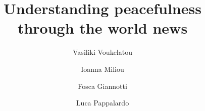 \documentclass{bmcart}
\begin{document}
\begin{frontmatter}

\begin{fmbox}


\title{Understanding peacefulness through the world news}


\author[
   addressref={aff1, aff3},                   %
   corref={aff3},                       %
   email={vasiliki.voukelatou@sns.it}   %
]{Vasiliki Voukelatou}
\author[
   addressref={aff2},
   email={ioanna.miliou@dsv.su.se}
]{Ioanna Miliou}
\author[
   addressref={aff1,aff3},
   email={fosca.giannotti@isti.cnr.it}
]{Fosca Giannotti}
\author[
   addressref={aff3},
   email={luca.pappalardo@isti.cnr.it}
]{Luca Pappalardo}


\address[id=aff1]{%
  , %
  ,                              %
}
\address[id=aff2]{%
  ,
}


\end{fmbox}
\end{frontmatter}
\end{document}
